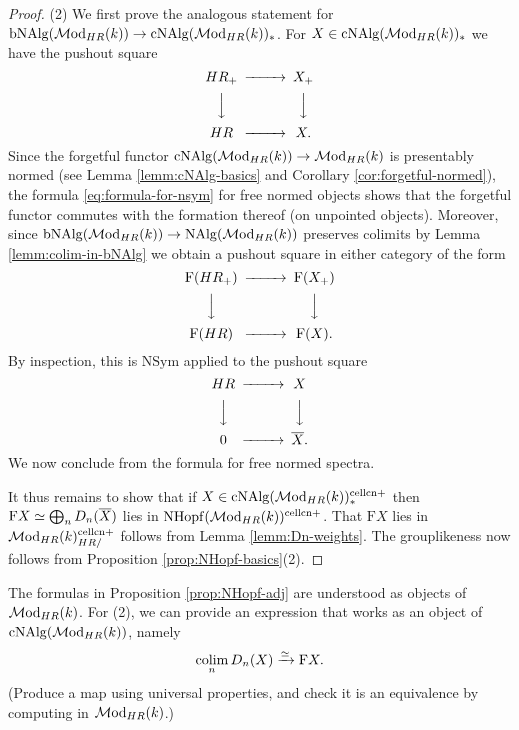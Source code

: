 \documentclass{amsart}
\renewcommand{\NB}[1]{}
\numberwithin{proposition}{section}
\numberwithin{equation}{section}
\def\cell{\mathrm{cell}}
\def\NSym{\mathrm{NSym}}
\def\NHopf{\mathrm{NHopf}}
\def\cNAlg{\mathrm{cNAlg}}
\def\bNAlg{\mathrm{bNAlg}}
\def\cn{\mathrm{cn}}
\def\Free{\mathrm{F}}
\begin{document}
\begin{proof}
(2) We first prove the analogous statement for $\bNAlg(\Mod_{HR}(k)) \to \cNAlg(\Mod_{HR}(k))_*$.
For $X \in \cNAlg(\Mod_{HR}(k))_*$ we have the pushout square\NB{details?}
\begin{equation*}
\begin{CD}
HR_+ @>>> X_+ \\
@VVV     @VVV \\
HR @>>> X.
\end{CD}
\end{equation*}
Since the forgetful functor $\cNAlg(\Mod_{HR}(k)) \to \Mod_{HR}(k)$  is presentably normed (see Lemma \ref{lemm:cNAlg-basics} and Corollary \ref{cor:forgetful-normed}), the formula \eqref{eq:formula-for-nsym} for free normed objects shows that the forgetful functor commutes with the formation thereof (on unpointed objects).
Moreover, since $\bNAlg(\Mod_{HR}(k)) \to \NAlg(\Mod_{HR}(k))$ preserves colimits by Lemma \ref{lemm:colim-in-bNAlg} we obtain a pushout square in either category of the form
\begin{equation*}
\begin{CD}
\Free(HR_+) @>>> \Free(X_+) \\
@VVV     @VVV \\
\Free(HR) @>>> \Free(X).
\end{CD}
\end{equation*}
By inspection, this is $\NSym$ applied to the pushout square
\begin{equation*}
\begin{CD}
HR @>>> X \\
@VVV   @VVV \\
0  @>>> \overline{X}.
\end{CD}
\end{equation*}
We now conclude from the formula for free normed spectra.

It thus remains to show that if $X \in \cNAlg(\Mod_{HR}(k))^{\cell\cn+}_*$ then $\Free X \wequi \bigoplus_n D_n(\overline{X})$ lies in $\NHopf(\Mod_{HR}(k))^{\cell\cn+}$.
That $\Free X$ lies in $\Mod_{HR}(k)_{HR/}^{\cell\cn+}$ follows from Lemma \ref{lemm:Dn-weights}.
The grouplikeness now follows from Proposition \ref{prop:NHopf-basics}(2).
\end{proof}

\begin{remark} \label{rmk:Free-as-coalg}
The formulas in Proposition \ref{prop:NHopf-adj} are understood as objects of $\mathcal{M}\mathrm{od}_{HR}(k)$.
For (2), we can provide an expression that works as an object of $\cNAlg(\Mod_{HR}(k))$, namely \[ \colim_n D_n(X) \xrightarrow{\wequi} \Free X. \]
(Produce a map using universal properties, and check it is an equivalence by computing in $\mathcal{M}\mathrm{od}_{HR}(k)$.)
\end{remark}
\end{document}
